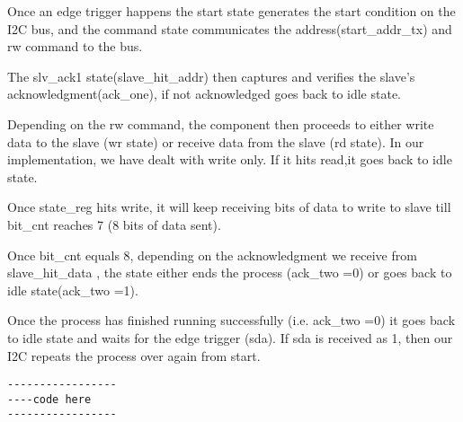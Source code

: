 \documentclass[10pt,twocolumn]{IEEEtran}
\begin{document}
Once an edge trigger happens the start state generates the start condition on the I2C bus, and the command state communicates the address(start\_addr\_tx) and rw command to the bus. 

The slv\_ack1 state(slave\_hit\_addr) then captures and verifies the slave’s acknowledgment(ack\_one), if not acknowledged goes back to idle state. 

Depending on the rw command, the component then proceeds to either write data to the slave (wr state) or receive data from the slave (rd state). 
In our implementation, we have dealt with write only. If it hits read,it goes back to idle state.

Once state\_reg hits write, it will keep receiving bits of data to write to slave till bit\_cnt reaches 7 (8 bits of data sent).

Once bit\_cnt equals 8, depending on the acknowledgment we receive from slave\_hit\_data , the state either ends the process (ack\_two =0) or goes back to idle state(ack\_two =1). 

Once the process has finished running successfully (i.e. ack\_two =0) it goes back to idle state and waits for the edge trigger (sda). If sda is received as 1, then our I2C repeats the process over again from start.
  
  \begin{verbatim}
-----------------
----code here
-----------------
  \end{verbatim}
\end{document}
